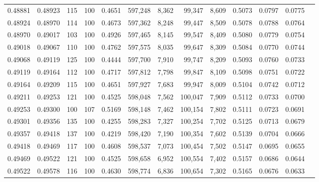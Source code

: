 \begin{tabular}{rrrrrrrrrrrrr}
0.48881 & 0.48923 &   115 & 100 &                                     0.4651 & 597,248 &   8,362 &  99,347 &   8,609 & 0.5073 & 0.0797 & 0.0775 \\
0.48924 & 0.48970 &   114 & 100 &                                     0.4673 & 597,362 &   8,248 &  99,447 &   8,509 & 0.5078 & 0.0788 & 0.0764 \\
0.48970 & 0.49017 &   103 & 100 &                                     0.4926 & 597,465 &   8,145 &  99,547 &   8,409 & 0.5080 & 0.0779 & 0.0754 \\
0.49018 & 0.49067 &   110 & 100 &                                     0.4762 & 597,575 &   8,035 &  99,647 &   8,309 & 0.5084 & 0.0770 & 0.0744 \\
0.49068 & 0.49119 &   125 & 100 &                                     0.4444 & 597,700 &   7,910 &  99,747 &   8,209 & 0.5093 & 0.0760 & 0.0733 \\
0.49119 & 0.49164 &   112 & 100 &                                     0.4717 & 597,812 &   7,798 &  99,847 &   8,109 & 0.5098 & 0.0751 & 0.0722 \\
0.49164 & 0.49209 &   115 & 100 &                                     0.4651 & 597,927 &   7,683 &  99,947 &   8,009 & 0.5104 & 0.0742 & 0.0712 \\
0.49211 & 0.49253 &   121 & 100 &                                     0.4525 & 598,048 &   7,562 & 100,047 &   7,909 & 0.5112 & 0.0733 & 0.0700 \\
0.49253 & 0.49300 &   100 & 107 &                                     0.5169 & 598,148 &   7,462 & 100,154 &   7,802 & 0.5111 & 0.0723 & 0.0691 \\
0.49301 & 0.49356 &   135 & 100 &                                     0.4255 & 598,283 &   7,327 & 100,254 &   7,702 & 0.5125 & 0.0713 & 0.0679 \\
0.49357 & 0.49418 &   137 & 100 &                                     0.4219 & 598,420 &   7,190 & 100,354 &   7,602 & 0.5139 & 0.0704 & 0.0666 \\
0.49418 & 0.49469 &   117 & 100 &                                     0.4608 & 598,537 &   7,073 & 100,454 &   7,502 & 0.5147 & 0.0695 & 0.0655 \\
0.49469 & 0.49522 &   121 & 100 &                                     0.4525 & 598,658 &   6,952 & 100,554 &   7,402 & 0.5157 & 0.0686 & 0.0644 \\
0.49522 & 0.49578 &   116 & 100 &                                     0.4630 & 598,774 &   6,836 & 100,654 &   7,302 & 0.5165 & 0.0676 & 0.0633 \\

\end{tabular}
